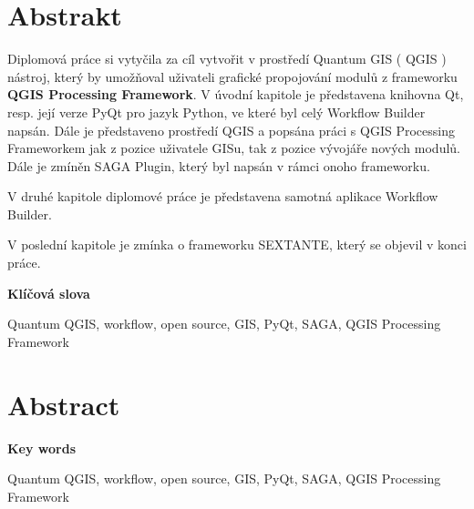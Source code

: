 \section*{Abstrakt}\label{abstrakt}
\indent Diplomová práce si vytyčila za cíl vytvořit v prostředí Quantum GIS ( QGIS ) nástroj, který by umožňoval uživateli grafické propojování modulů z frameworku \textbf{QGIS Processing Framework}. V úvodní kapitole je představena knihovna Qt, resp. její verze PyQt pro jazyk Python, ve které byl celý Workflow Builder napsán. Dále je představeno prostředí QGIS a popsána práci s QGIS Processing Frameworkem jak z pozice uživatele GISu, tak z pozice vývojáře nových modulů. Dále je zmíněn SAGA Plugin, který byl napsán v rámci onoho frameworku.

V druhé kapitole diplomové práce je představena samotná aplikace Workflow Builder.

V poslední kapitole je zmínka o frameworku SEXTANTE, který se objevil v konci práce.

\textbf{Klíčová slova}

Quantum QGIS, workflow, open source, GIS, PyQt, SAGA, QGIS Processing Framework


\vfill

\section*{Abstract}
\indent

\textbf{Key words}

Quantum QGIS, workflow, open source, GIS, PyQt, SAGA, QGIS Processing Framework